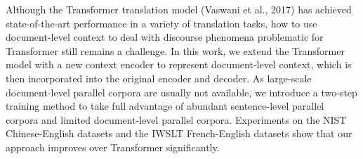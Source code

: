 Although the Transformer translation model (Vaswani et al., 2017) has achieved state-of-the-art performance in a variety of translation tasks, how to use document-level context to deal with discourse phenomena problematic for Transformer still remains a challenge. In this work, we extend the Transformer model with a new context encoder to represent document-level context, which is then incorporated into the original encoder and decoder. As large-scale document-level parallel corpora are usually not available, we introduce a two-step training method to take full advantage of abundant sentence-level parallel corpora and limited document-level parallel corpora. Experiments on the NIST Chinese-English datasets and the IWSLT French-English datasets show that our approach improves over Transformer significantly.
